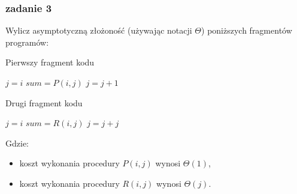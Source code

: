 \documentclass[11pt,a4paper]{article}
\begin{document}
\subsubsection{zadanie 3}
Wylicz asymptotyczną złożoność (używając notacji $\Theta$) poniższych fragmentów programów:

\begin{algorithm}
\caption{Pierwszy fragment kodu}
\begin{algorithmic}[1]
    \State $j = i$
        \State $sum = P(i, j)$
        \State $j = j + 1$
    \EndWhile
\EndFor
\end{algorithmic}
\end{algorithm}

\begin{algorithm}
\caption{Drugi fragment kodu}
\begin{algorithmic}[1]
    \State $j = i$
        \State $sum = R(i, j)$
        \State $j = j + j$
    \EndWhile
\EndFor
\end{algorithmic}
\end{algorithm}
Gdzie:
\begin{itemize}
    \item koszt wykonania procedury $P(i,j)$ wynosi $\Theta(1)$,
    \item koszt wykonania procedury $R(i,j)$ wynosi $\Theta(j)$.
\end{itemize}
\end{document}
